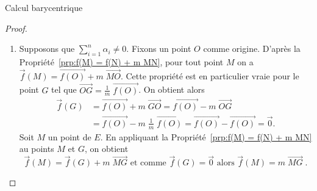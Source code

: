 \begin{chapter}{Calcul barycentrique}
\begin{prp}
\begin{proof}
\begin{enumerate}
				Soient $M$ et $N$ deux points.
				D'apr\`es la Propri\'et\'e~\ref{prp:f(M) = f(N) + m MN}, 
				on a $\vec{f}(M) = \vec{f}(N) + m \; \overrightarrow{MN}$.
				Comme $m = 0$ alors $\vec{f}(M) = \vec{f}(N)$.
				On d\'eduit que $\vec{f}$ est constante.
			\item Supposons que $\sum_{i = 1}^{n} \alpha_i \neq 0$. 
				Fixons un point $O$ comme origine. 
				D'apr\`es la Propri\'et\'e~\ref{prp:f(M) = f(N) + m MN}, 
				pour tout point $M$ on a $\vec{f}(M) = \overrightarrow{f(O)} + m \; \overrightarrow{MO}$.
				Cette propri\'et\'e est en particulier vraie pour le point $G$ tel que
				$\overrightarrow{OG} = \frac{1}{m} \; \overrightarrow{f(O)}$.
				On obtient alors 
				\begin{align*}
					\vec{f}(G) & = \overrightarrow{f(O)} + m \;\overrightarrow{GO}                 
						  = \overrightarrow{f(O)} - m \;\overrightarrow{OG}                         \\
						& = \overrightarrow{f(O)} - m \; \frac{1}{m} \; \overrightarrow{f(O)}       
						  = \overrightarrow{f(O)} - \overrightarrow{f(O)}                           
						  = \vec{0}                                           .
				\end{align*}
				Soit $M$ un point de $E$.
				En appliquant la Propri\'et\'e~\ref{prp:f(M) = f(N) + m MN} au points $M$ et $G$, on obtient 
				$$
					\vec{f}(M) = \vec{f}(G) + m \; \overrightarrow{MG} 
							\text{ et comme $\vec{f}(G) = \vec{0}$ alors } \vec{f}(M) 
						= m \; \overrightarrow{MG} 
					\; .
				$$
		\end{enumerate}
	\end{proof}
\end{prp}
%
%

\end{chapter}
